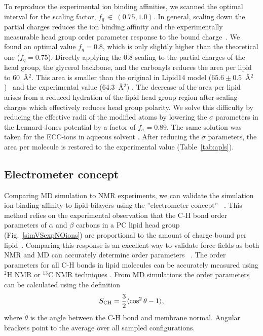 \documentclass[aip,jcp,twocolumn]{revtex4}
\begin{document}
To reproduce the experimental ion binding affinities,
we scanned the optimal interval for the scaling factor, $f_q~\in~(0.75, 1.0)$.
In general, scaling down the partial charges reduces the ion binding affinity 
and the experimentally measurable head group order parameter response to the bound charge~\cite{akutsu81, altenbach84, scherer89}. We found an optimal value $f_q = 0.8$, which is only slightly higher than the theoretical one ($f_q=0.75$). Directly applying the 0.8 scaling to the partial charges of the head group, the glycerol backbone, and the carbonyls reduces the area per lipid to 60~\AA$^2$. This area is smaller than the original in Lipid14 model ($65.6 \pm 0.5$~\AA$^2$)~\cite{dickson14} and the experimental value (64.3~\AA$^2$) \cite{kucerka11}. The decrease of the area per lipid arises from a reduced hydration of the lipid head group region after scaling charges which effectively reduces head group polarity. 
We solve this difficulty by reducing the effective radii of the modified atoms by lowering the $\sigma$ parameters in the Lennard-Jones potential by a factor of $f_\sigma = 0.89$. The same solution was taken for the ECC-ions in aqueous solvent \cite{kohagen14, kohagen16, Pluharova2014}. After reducing the $\sigma$ parameters, the area per molecule is restored to the experimental value (Table~\ref{tab:apls}). 




\subsection{Electrometer concept} \label{section:electrometer}
Comparing MD simulation to NMR experiments, we can validate the simulation ion binding affinity to lipid bilayers using the ''electrometer concept''~ \cite{seelig87, catte16}. This method relies on the experimental observation that the C-H bond order parameters of $\alpha$ and $\beta$ carbons in a PC lipid head group (Fig.~\ref{simVSexpNOions}) are proportional to the amount of charge bound per lipid~\cite{seelig87}. Comparing this response is an excellent way to validate force fields as both NMR and MD can accurately determine order parameters ~\cite{catte16, ollila16}. The order parameters for all C-H bonds in lipid molecules can be accurately measured using $^2$H NMR or $^{13}$C NMR techniques \cite{ollila16}. From MD simulations the order parameters can be calculated using the definition
\begin{equation}\label{OP}
S_{\rm CH}=\frac{3}{2}\langle \cos^2\theta -1 \rangle,
\end{equation}
where $\theta$ is the angle between the C-H bond and membrane normal. Angular brackets point to the average over all sampled configurations.
\end{document}
